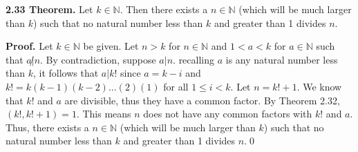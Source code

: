 \documentclass[12pt]{article}
\begin{document}
\noindent\textbf{2.33 Theorem.} Let $k\in\mathbb{N}$. Then there exists a $n\in\mathbb{N}$ (which will be much larger than $k$) such that no natural number less than $k$ and greater than 1 divides $n$.

\bigskip

\noindent\textbf{Proof.} Let $k\in\mathbb{N}$ be given. Let $n>k$ for $n\in\mathbb{N}$ and $1<a<k$ for $a\in\mathbb{N}$ such that $a\not| n$. By contradiction, suppose $a|n$. recalling $a$ is any natural number less than $k$, it follows that $a|k!$ since $a=k-i$ and $k!=k(k-1)(k-2)...(2)(1)$ for all $1\leq i< k$. Let $n=k!+1$. We know that $k!$ and $a$ are divisible, thus they have a common factor. By Theorem 2.32, $(k!, k!+1)=1$. This means $n$ does not have any common factors with $k!$ and $a$. Thus, there exists a $n\in\mathbb{N}$ (which will be much larger than $k$) such that no natural number less than $k$ and greater than 1 divides $n$.\qed
\end{document}
